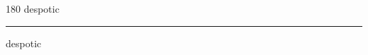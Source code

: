 
\begin{frame}
\begin{center}
\begin{turn}{180}
{\fontsize{2.5cm}{1em}\selectfont despotic}
\end{turn}
\vspace{1em}\par  
\hrule
\vspace{1em}\par  
{\fontsize{2.5cm}{1em}\selectfont despotic}
\end{center}
\end{frame}
